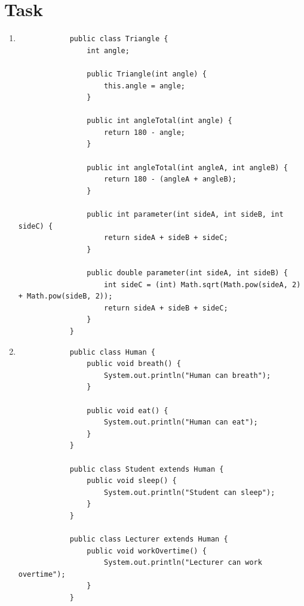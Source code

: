 \documentclass[12pt,titlepage]{article}
\begin{document}
\section{Task}
\begin{enumerate}
    \item {
        \begin{verbatim}
            public class Triangle {
                int angle;

                public Triangle(int angle) {
                    this.angle = angle;
                }

                public int angleTotal(int angle) {
                    return 180 - angle;
                }

                public int angleTotal(int angleA, int angleB) {
                    return 180 - (angleA + angleB);
                }

                public int parameter(int sideA, int sideB, int sideC) {
                    return sideA + sideB + sideC;
                }

                public double parameter(int sideA, int sideB) {
                    int sideC = (int) Math.sqrt(Math.pow(sideA, 2) + Math.pow(sideB, 2));
                    return sideA + sideB + sideC;
                }
            }
        \end{verbatim}
    }
    \item {
        \begin{verbatim}
            public class Human {
                public void breath() {
                    System.out.println("Human can breath");
                }

                public void eat() {
                    System.out.println("Human can eat");
                }
            }

            public class Student extends Human {
                public void sleep() {
                    System.out.println("Student can sleep");
                }
            }

            public class Lecturer extends Human {
                public void workOvertime() {
                    System.out.println("Lecturer can work overtime");
                }
            }
        \end{verbatim}
    }
\end{enumerate}
\end{document}
